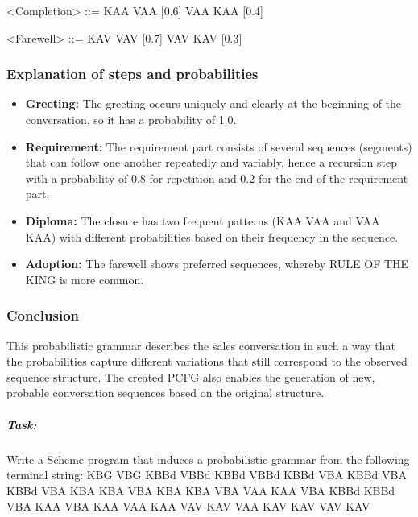 \documentclass[
]{article}
\begin{document}
\textless Completion\textgreater{} ::= KAA VAA {[}0.6{]} \textbar{} VAA
KAA {[}0.4{]}

\textless Farewell\textgreater{} ::= KAV VAV {[}0.7{]} \textbar{} VAV
KAV {[}0.3{]}

\subsubsection{\texorpdfstring{\textbf{Explanation of steps and
probabilities}}{Explanation of steps and probabilities}}\label{explanation-of-steps-and-probabilities}

\begin{itemize}
\item
  \textbf{Greeting:} The greeting occurs uniquely and clearly at the
  beginning of the conversation, so it has a probability of 1.0.
\item
  \textbf{Requirement:} The requirement part consists of several
  sequences (segments) that can follow one another repeatedly and
  variably, hence a recursion step with a probability of 0.8 for
  repetition and 0.2 for the end of the requirement part.
\item
  \textbf{Diploma:} The closure has two frequent patterns (KAA VAA and
  VAA KAA) with different probabilities based on their frequency in the
  sequence.
\item
  \textbf{Adoption:} The farewell shows preferred sequences, whereby
  RULE OF THE KING is more common.
\end{itemize}

\subsubsection{\texorpdfstring{\textbf{Conclusion}}{Conclusion}}\label{conclusion}

This probabilistic grammar describes the sales conversation in such a
way that the probabilities capture different variations that still
correspond to the observed sequence structure. The created PCFG also
enables the generation of new, probable conversation sequences based on
the original structure.

\subparagraph{\texorpdfstring{\textbf{Task:}}{Task:}}\label{task-3}

Write a Scheme program that induces a probabilistic grammar from the
following terminal string: KBG VBG KBBd VBBd KBBd VBBd KBBd VBA KBBd VBA
KBBd VBA KBA KBA VBA KBA KBA VBA VAA KAA VBA KBBd KBBd VBA KAA VBA KAA
VAA KAA VAV KAV VAA KAV KAV VAV KAV
\end{document}
